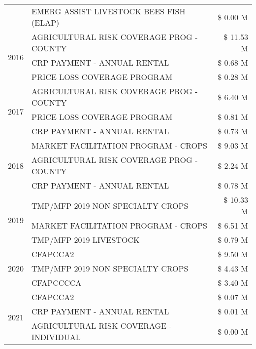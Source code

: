 \begin{tabular}{llr}
 & EMERG ASSIST LIVESTOCK BEES FISH (ELAP) & \$ 0.00 M \\
\cline{1-3}
\multirow[t]{3}{*}{2016} & AGRICULTURAL RISK COVERAGE PROG - COUNTY & \$ 11.53 M \\
 & CRP PAYMENT - ANNUAL RENTAL & \$ 0.68 M \\
 & PRICE LOSS COVERAGE PROGRAM & \$ 0.28 M \\
\cline{1-3}
\multirow[t]{3}{*}{2017} & AGRICULTURAL RISK COVERAGE PROG - COUNTY & \$ 6.40 M \\
 & PRICE LOSS COVERAGE PROGRAM & \$ 0.81 M \\
 & CRP PAYMENT - ANNUAL RENTAL & \$ 0.73 M \\
\cline{1-3}
\multirow[t]{3}{*}{2018} & MARKET FACILITATION PROGRAM - CROPS & \$ 9.03 M \\
 & AGRICULTURAL RISK COVERAGE PROG - COUNTY & \$ 2.24 M \\
 & CRP PAYMENT - ANNUAL RENTAL & \$ 0.78 M \\
\cline{1-3}
\multirow[t]{3}{*}{2019} & TMP/MFP 2019 NON SPECIALTY CROPS & \$ 10.33 M \\
 & MARKET FACILITATION PROGRAM - CROPS & \$ 6.51 M \\
 & TMP/MFP 2019 LIVESTOCK & \$ 0.79 M \\
\cline{1-3}
\multirow[t]{3}{*}{2020} & CFAPCCA2 & \$ 9.50 M \\
 & TMP/MFP 2019 NON SPECIALTY CROPS & \$ 4.43 M \\
 & CFAPCCCCA & \$ 3.40 M \\
\cline{1-3}
\multirow[t]{3}{*}{2021} & CFAPCCA2 & \$ 0.07 M \\
 & CRP PAYMENT - ANNUAL RENTAL & \$ 0.01 M \\
 & AGRICULTURAL RISK COVERAGE - INDIVIDUAL & \$ 0.00 M \\
\cline{1-3}
\bottomrule
\end{tabular}
